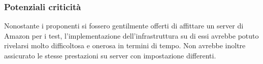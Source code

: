 \subsubsection{Potenziali criticità}
Nonostante i proponenti si fossero gentilmente offerti di affittare un server di Amazon per i test, l'implementazione dell'infrastruttura su di essi avrebbe potuto rivelarsi molto difficoltosa e onerosa in termini di tempo. Non avrebbe inoltre assicurato le stesse prestazioni su server con impostazione differenti.



